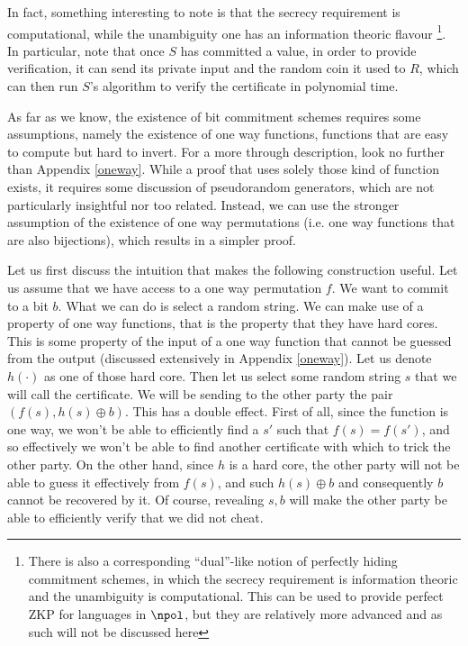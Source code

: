 \documentclass{article}
\begin{document}
In fact, something interesting to note is that the secrecy requirement is computational, while the unambiguity one has an information theoric flavour
\footnote{There is also a corresponding \enquote{dual}-like notion of perfectly hiding commitment schemes, in which the secrecy
    requirement is information theoric and the unambiguity is computational. This can be used to provide perfect ZKP for
    languages in $\npol$, but they are relatively more advanced and as such will not be discussed here}.
In particular, note that once $S$ has committed a value, in order to provide verification, it can send its private input and the random coin it used to $R$, which can then
run $S$'s algorithm to verify the certificate in polynomial time. \par
As far as we know, the existence of bit commitment schemes requires some assumptions, namely the existence of one way functions, functions that are easy to compute but hard to invert.
For a more through description, look no further than Appendix \ref{oneway}.
While a proof that uses solely those kind of function exists, it requires some discussion of pseudorandom generators, which are not particularly insightful nor too related.
Instead, we can use the stronger assumption of the existence of one way permutations (i.e. one way functions that are also bijections), which results in a simpler proof.\par
Let us first discuss the intuition that makes the following construction useful. Let us assume that we have access to a one way permutation $f$.
We want to commit to a bit $b$. What we can do is select a random string. We can make use of a property of one way functions, that is the
property that they have hard cores. This is some property of the input of a one way function that cannot be guessed from the output (discussed extensively in Appendix \ref{oneway}).
Let us denote $h(\cdot)$ as one of those hard core. Then let us select some random string $s$ that we will call the certificate. We will be sending to
the other party the pair $(f(s), h(s) \oplus b)$. This has a double effect. First of all, since the function is one way, we won't be able to
efficiently find a $s'$ such that $f(s) = f(s')$, and so effectively we won't be able to find another certificate with which to trick the other party.
On the other hand, since $h$ is a hard core, the other party will not be able to guess it effectively from $f(s)$, and such $h(s) \oplus b$ and consequently $b$ cannot
be recovered by it. Of course, revealing $s, b$ will make the other party be able to efficiently verify that we did not cheat.
\end{document}
